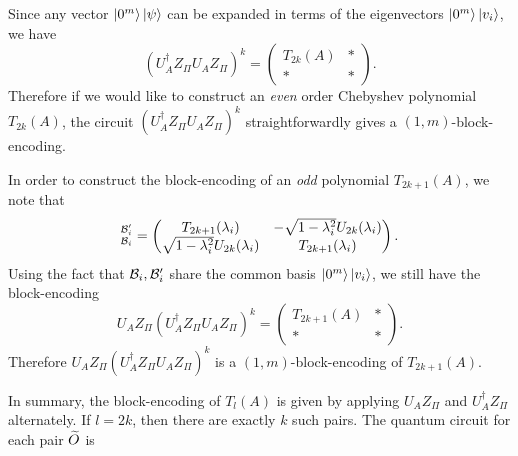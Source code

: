 Since any vector $\ket{0^m}\ket{\psi}$ can be expanded in terms of the eigenvectors $\ket{0^m}\ket{v_i}$, we have
\begin{equation}
(U_A^{\dag}Z_{\Pi}U_A Z_{\Pi})^{k}=\begin{pmatrix}
T_{2k}(A) & *\\
* & *
\end{pmatrix}.
\end{equation}
Therefore if we would like to construct an \emph{even} order Chebyshev polynomial $T_{2k}(A)$, the circuit $(U_A^{\dag}Z_{\Pi}U_A Z_{\Pi})^{k}$ straightforwardly gives a $(1,m)$-block-encoding.

In order to construct the block-encoding of an \emph{odd} polynomial $T_{2k+1}(A)$, we note that
\begin{equation}
[U_A Z_{\Pi}(U_A^{\dag}Z_{\Pi}U_A Z_{\Pi})^{k}]_{\mc{B}_i}^{\mc{B}_{i}'}=\begin{pmatrix}
T_{2k+1}(\lambda_i) & -\sqrt{1-\lambda_i^2}U_{2k}(\lambda_i)\\
\sqrt{1-\lambda_i^2}U_{2k}(\lambda_i) & T_{2k+1}(\lambda_i)
\end{pmatrix}.
\end{equation}
Using the fact that $\mathcal{B}_i,\mathcal{B}_i'$ share the common basis $\ket{0^m}\ket{v_i}$, we still have the block-encoding
\begin{equation}
U_A Z_{\Pi}(U_A^{\dag}Z_{\Pi}U_A Z_{\Pi})^{k}=\begin{pmatrix}
T_{2k+1}(A) & *\\
* & *
\end{pmatrix}.
\end{equation}
Therefore $U_A Z_{\Pi}(U_A^{\dag}Z_{\Pi}U_A Z_{\Pi})^{k}$ is a $(1,m)$-block-encoding of $T_{2k+1}(A)$. 

In summary, the block-encoding of $T_{l}(A)$ is given by applying $U_A Z_{\Pi}$ and $U^{\dag}_A Z_{\Pi}$ alternately. 
If $l=2k$, then there are exactly $k$ such pairs. 
The quantum circuit for each pair $\widetilde{O}$ is

